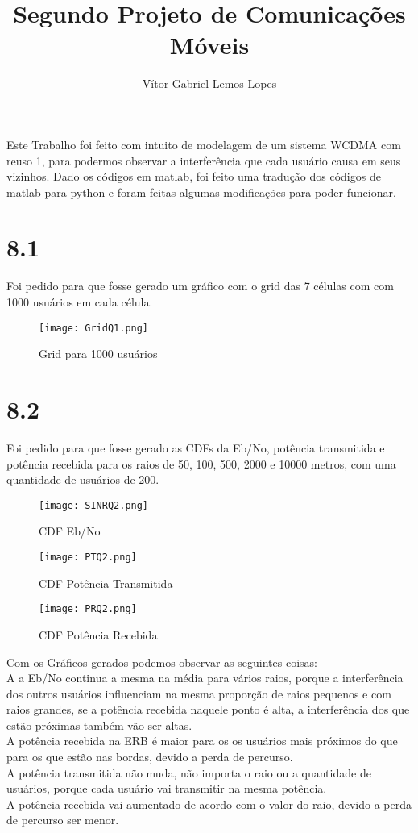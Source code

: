 \documentclass[12pt]{article}
\title{Segundo Projeto de Comunicações Móveis}
\author{Vítor Gabriel Lemos Lopes}
\begin{document}
 

\maketitle

     
\begin{resumo} 
  Este Trabalho foi feito com intuito de modelagem de um sistema WCDMA com reuso 1, para podermos observar a interferência que cada usuário causa em seus vizinhos. Dado os códigos em matlab, foi feito uma tradução dos códigos de matlab para python e foram feitas algumas modificações para poder funcionar.
\end{resumo}
 
\section{\huge 8.1} \label{sec:firstpage}
Foi pedido para que fosse gerado um gráfico com o grid das 7 células com com 1000 usuários em cada célula.
\begin{figure}[h]
    \centering
    \texttt{[image: GridQ1.png]}
    \caption{Grid para 1000 usuários}
    \label{fig:my_label}
\end{figure}

\section{\huge 8.2}

Foi pedido para que fosse gerado as CDFs da Eb/No, potência transmitida e potência recebida para os raios de  50, 100, 500, 2000 e 10000 metros, com uma quantidade de usuários de 200.
\begin{figure}[h]
    \centering
    \texttt{[image: SINRQ2.png]}
    \caption{CDF Eb/No}
    \label{fig:my_label}
\end{figure}
\begin{figure}[h]
    \centering
    \texttt{[image: PTQ2.png]}
    \caption{CDF Potência Transmitida}
    \label{fig:my_label}
\end{figure}
\begin{figure}[h]
    \centering
    \texttt{[image: PRQ2.png]}
    \caption{CDF Potência Recebida}
    \label{fig:my_label}
\end{figure}
\FloatBarrier
Com os Gráficos gerados podemos observar as seguintes coisas:\\
A a Eb/No continua a mesma na média para vários raios, porque a interferência dos outros usuários influenciam na mesma proporção de raios pequenos e com raios grandes, se a potência recebida naquele ponto é alta, a interferência dos que estão próximas também vão ser altas. \\
A potência recebida na ERB é maior para os os usuários mais próximos do que para os que estão nas bordas, devido a perda de percurso.\\
A potência transmitida não muda, não importa o raio ou a quantidade de usuários, porque cada usuário vai transmitir na mesma potência.\\
A potência recebida vai aumentado de acordo com o valor do raio, devido a perda de percurso ser menor.
\end{document}
